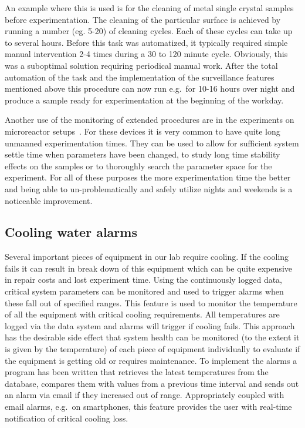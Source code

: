 An example where this is used is for the cleaning of metal single crystal
samples before experimentation. The cleaning of the particular surface is achieved by
running a number (eg. 5-20) of cleaning cycles. Each of these cycles can take up to
several hours. Before this task was automatized, it typically required simple
manual intervention 2-4 times during a 30 to 120 minute cycle. Obviously, this
was a suboptimal solution requiring periodical manual work. After
the total automation of the task and the implementation of the surveillance
features mentioned above this procedure can now run e.g.\ for 10-16 hours over
night and produce a sample ready for experimentation at the beginning of the
workday.

Another use of the monitoring of extended procedures are in the experiments on
microreactor setups~\cite{Henriksen2009}. For these devices it is very common
to have quite long unmanned experimentation times. They can be used to allow
for sufficient system settle time when parameters have been changed, to study
long time stability effects on the samples or to thoroughly search the
parameter space for the experiment. For all of these purposes the more
experimentation time the better and being able to un-problematically and safely
utilize nights and weekends is a noticeable improvement.

\subsection{Cooling water alarms}\label{sec:cooling_water_alarms}
Several important pieces of equipment in our lab require cooling. If the
cooling fails it can result in break down of this equipment which can
be quite expensive in repair costs and lost experiment time. Using the
continuously logged data, critical system parameters can be monitored and used
to trigger alarms when these fall out of specified ranges. This feature is
used to monitor the temperature of all the
equipment with critical cooling requirements. All temperatures are 
logged via the data system and alarms will trigger if cooling fails. This approach has the desirable side
effect that system health can be monitored (to the extent it is given by the
temperature) of each piece of equipment individually to evaluate if the
equipment is getting old or requires maintenance. To implement the alarms a
program has been written that retrieves the latest temperatures from the
database, compares them with values from a previous time interval and sends out
an alarm via email if they increased out of range. Appropriately coupled with
email alarms, e.g.\ on smartphones, this feature provides the user with real-time
notification of critical cooling loss.
